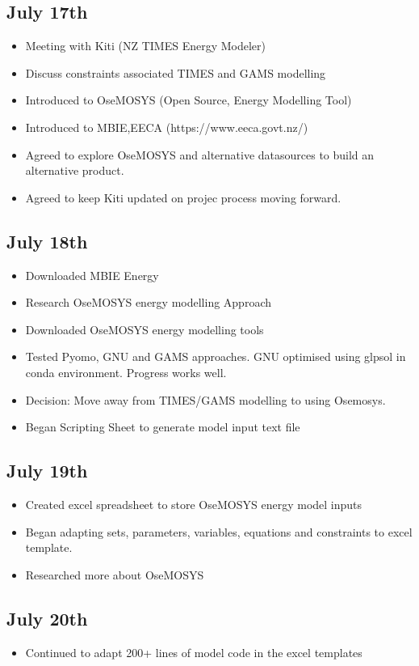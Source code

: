 \documentclass[12pt]{article}
\begin{document}
\subsection*{July 17th}
\begin{itemize}
	\item Meeting with Kiti (NZ TIMES Energy Modeler)
	\item Discuss constraints associated TIMES and GAMS modelling
	\item Introduced to OseMOSYS (Open Source, Energy Modelling Tool)
	\item Introduced to MBIE,EECA (https://www.eeca.govt.nz/)
	\item Agreed to explore OseMOSYS and alternative datasources to build an alternative product.
	\item Agreed to keep Kiti updated on projec process moving forward.
\end{itemize}
\subsection*{July 18th}
\begin{itemize}
	\item Downloaded MBIE Energy 
	\item Research OseMOSYS energy modelling Approach
	\item Downloaded OseMOSYS energy modelling tools
	\item Tested Pyomo, GNU and GAMS approaches. GNU optimised using glpsol in conda environment. Progress works well.
	\item Decision: Move away from TIMES/GAMS modelling to using Osemosys.
	\item Began Scripting Sheet to generate model input text file
\end{itemize}
\subsection*{July 19th}
\begin{itemize}
	\item Created excel spreadsheet to store OseMOSYS energy model inputs
	\item Began adapting sets, parameters, variables, equations and constraints to excel template.
	\item Researched more about OseMOSYS
\end{itemize}
\subsection*{July 20th}
\begin{itemize}
	\item Continued to adapt 200+ lines of model code in the excel templates
\end{itemize}
\end{document}
